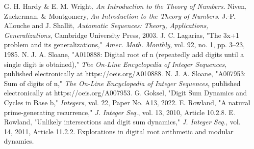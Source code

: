 \documentclass[12pt]{article}
\begin{document}
\begin{thebibliography}{9}
 G. H. Hardy \& E. M. Wright, \emph{An Introduction to the Theory of Numbers}.
 Niven, Zuckerman, \& Montgomery, \emph{An Introduction to the Theory of Numbers}.
 J.-P. Allouche and J. Shallit, \emph{Automatic Sequences: Theory, Applications, Generalizations}, Cambridge University Press, 2003.
 J. C. Lagarias, "The 3x+1 problem and its generalizations," \emph{Amer. Math. Monthly}, vol. 92, no. 1, pp. 3--23, 1985.
 N. J. A. Sloane, "A010888: Digital root of n (repeatedly add digits until a single digit is obtained)," \emph{The On-Line Encyclopedia of Integer Sequences}, published electronically at https://oeis.org/A010888.
 N. J. A. Sloane, "A007953: Sum of digits of n," \emph{The On-Line Encyclopedia of Integer Sequences}, published electronically at https://oeis.org/A007953.
 G. Goksel, "Digit Sum Dynamics and Cycles in Base b," \emph{Integers}, vol. 22, Paper No. A13, 2022.
 E. Rowland, "A natural prime-generating recurrence," \emph{J. Integer Seq.}, vol. 13, 2010, Article 10.2.8.
 E. Rowland, "Unlikely intersections and digit sum dynamics," \emph{J. Integer Seq.}, vol. 14, 2011, Article 11.2.2.
 Explorations in digital root arithmetic and modular dynamics.
\end{thebibliography}
\end{document}
